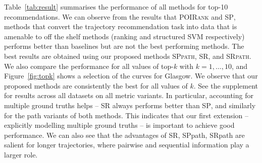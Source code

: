 Table~\ref{tab:result} summarises the performance of all methods for top-10 recommendations.
We can observe from the results that \textsc{POIRank} and \textsc{SP},
methods that convert the trajectory recommendation task
into data that is amenable to off the shelf methods (ranking and structured SVM respectively)
performs better than baselines but are not the best performing methods.
The best results are obtained using our proposed methods
\textsc{SPpath}, \textsc{SR}, and \textsc{SRpath}.
We also compare the performance for all values of top-$k$ with $k=1,\ldots,10$, and
Figure~\ref{fig:topk} shows a selection of the curves for Glasgow. We observe that
our proposed methods are consistently the best for all values of $k$.
See the supplement for results across all datasets on all metric variants.
In particular,
accounting for multiple ground truths helps --
\textsc{SR} always performs better than \textsc{SP},
and similarly for the {\sc path} variants of both methods.
This indicates that our first extension -- explicitly modelling multiple ground truths
 -- is important to achieve good performance.
We can also see that the advantages of {\sc SR}, {\sc SPpath}, {\sc SRpath} are salient for longer trajectories, where pairwise and sequential information play a larger role.



